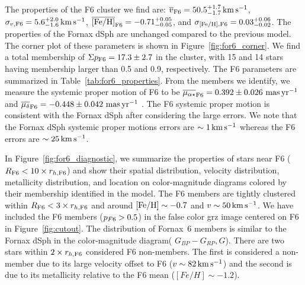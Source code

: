 \documentclass[twocolumn]{aastex63}
\begin{document}
The properties of the F6 cluster we find are:  
$\overline{v}_{\rm F6} = 50.5_{-1.7}^{+1.7} \mathrm{\,km} \mathrm{\,s}^{-1}$,
$\sigma_{v, {\rm F6}} = 5.6_{-1.6}^{+2.0} \mathrm{\,km} \mathrm{\,s}^{-1}$,
$\overline{\rm [Fe/H]}_{\rm F6} = -0.71_{-0.05}^{+0.05}$, and
$\sigma_{\rm [Fe/H], {\rm F6}} = 0.03_{-0.02}^{+0.06}$.
The properties of the Fornax dSph are unchanged compared to the previous model.
The corner plot of these parameters is shown in Figure~\ref{fig:for6_corner}.
We find a total membership of $\Sigma p_{\rm F6} = 17.3\pm2.7$ in the cluster, with 15 and 14 stars having membership larger than 0.5 and 0.9, respectively.
The F6 parameters are summarized in Table~\ref{tab:for6_properties}.
From the members we identify, we measure the systemic proper motion of F6 to be  $\overline{\mu_{\alpha \star} }_{\rm F6}=0.392\pm0.026 \mathrm{\,\mathrm{\,mas} \mathrm{\,yr}^{-1}}$ and 
$\overline{\mu_{\delta }}_{\rm F6}=-0.448\pm0.042 \mathrm{\,\mathrm{\,mas} \mathrm{\,yr}^{-1}}$ .
The F6 systemic proper motion is consistent with the Fornax dSph after considering the large errors. We note that the Fornax dSph systemic proper motions errors are $\sim 1\mathrm{\,km} \mathrm{\,s}^{-1}$ whereas the F6 errors are  $\sim25\mathrm{\,km} \mathrm{\,s}^{-1}$. 




In Figure~\ref{fig:for6_diagnostic}, we summarize the properties of stars near F6 ($R_{\rm F6}<10\times r_{ h, {\rm F6}}$) and show their spatial distribution, velocity distribution, metallicity distribution, and location on color-magnitude diagrams colored by their membership identified in the model.
The F6 members are tightly clustered within $R_{\rm F6}<3\times r_{ h,{\rm F6}}$ and around ${\rm [Fe/H]}\sim -0.7$ and $v \sim 50 \mathrm{\,km} \mathrm{\,s}^{-1}$. 
We have included the F6 members ($p_{F\rm 6}>0.5$) in the false color grz image centered on F6 in Figure~\ref{fig:cutout}.
The distribution of Fornax~6 members is similar to the Fornax dSph in the color-magnitude diagram( $G_{BP}-G_{RP}, G$).
There are two stars within $2\times r_{h,{\rm F6}}$ considered F6 non-members.  
The first is considered a non-member due to its large velocity offset to F6 ($v\sim82 \mathrm{\,km} \mathrm{\,s}^{-1}$) and the second is due to its  metallicity relative to the F6 mean ($[Fe/H]\sim-1.2$). 
\end{document}
